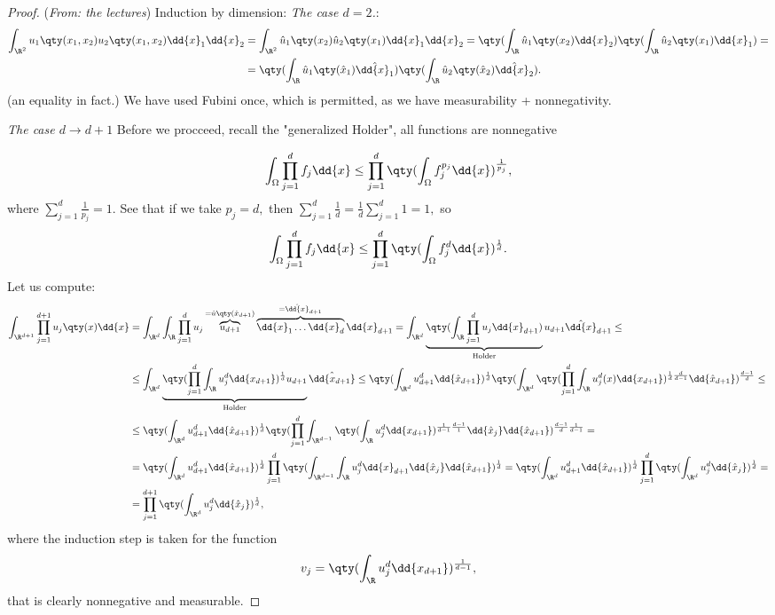 \begin{proof}(\textit{From: the lectures})
	Induction by dimension:
	\textit{The case $d = 2$.}:
	\begin{align*}
		\int_{\R^{2}}u_1\qty(x_1,x_2)u_2\qty(x_1,x_2)\dd{x}_1 \dd{x}_2 &= \int_{\R^{2}}\hat{u}_1\qty(x_2) \hat{u}_2\qty(x_1)\dd{x}_1 \dd{x}_2 = \qty(\int_{\R}\hat{u}_1\qty(x_2)\dd{x}_2) \qty(\int_{\R}\hat{u}_2\qty(x_1)\dd{x}_1) = \\
		&=\qty(\int_{\R}\hat{u}_1\qty(\hat{x}_1)\hat{\dd{x}_1})\qty(\int_{\R}\hat{u}_2\qty(\hat{x}_2)\hat{\dd{x}_2}).
	\end{align*}
	(an equality in fact.) We have used Fubini once, which is permitted, as we have measurability + nonnegativity.

	\textit{The case $d \to d+1$}
	Before we procceed, recall the "generalized Holder", all functions are nonnegative

	\[
		\int_{\Omega}\prod_{j=1}^d f_j\dd{x} \leq \prod_{j=1}^d \qty(\int_{\Omega}f_j^{p_j}\dd{x})^{\frac{1}{p_j}},
	\]
	where $\sum_{j=1}^d \frac{1}{p_j}  = 1.$ See that if we take $p_j = d,$ then $\sum_{j=1}^d \frac{1}{d} = \frac{1}{d} \sum_{j=1}^d 1 =1,$ so
	\[
		\int_{\Omega}\prod_{j=1}^d f_j \dd{x} \leq \prod_{j=1}^d\qty(\int_{\Omega}f_j^d\dd{x})^{\frac{1}{d}}.
	\]
	Let us compute:
	\begin{align*}
		\int_{\R^{d+1}}\prod_{j=1}^{d+1} u_j\qty(x)\dd{x}&=\int_{\R^d}\int_{\R}\prod_{j=1}^d u_j \overbrace{u_{d+1}}^{=\hat{u}\qty(\hat{x}_{d+1})}\overbrace{\dd{x}_1 \dots \dd{x}_d}^{=\hat{\dd{x}}_{d+1}}\dd{x}_{d+1} = \int_{\R^{d}}\underbrace{\qty(\int_{\R}\prod_{j=1}^d u_j\dd{x}_{d+1})}_{\text{Holder}}u_{d+1}\hat{\dd{x}}_{d+1} \leq \\
								 &\leq \int_{\R^d}\underbrace{\qty(\prod_{j=1}^d \int_{\R}u_j^d\dd{x_{d+1}})^{\frac{1}{d}}u_{d+1}}_{\text{Holder}}\hat{\dd{x_{d+1}}} \leq \qty(\int_{\R^{d}}u_{d+1}^d\dd{\hat{x}_{d+1}})^{\frac{1}{d}}\qty(\int_{\R^d}\qty(\prod_{j=1}^d \int_{\R}u_j^d(x)\dd{x_{d+1}})^{\frac{1}{d}\frac{d}{d-1}}\dd{\hat{x}_{d+1}})^{\frac{d-1}{d}} \leq \\
								 &\leq \qty(\int_{\R^d}u_{d+1}^d\dd{\hat{x}_{d+1}})^{\frac{1}{d}}\qty(\prod_{j=1}^d\int_{\R^{d-1}}\qty(\int_{\R}u_j^d\dd{x_{d+1}})^{\frac{1}{d-1}\frac{d-1}{1}}\dd{\hat{x}_j}\dd{\hat{x}_{d+1}})^{\frac{d-1}{d} \frac{1}{d-1}} = \\
								 &= \qty(\int_{\R^{d}}u_{d+1}^d \dd{\hat{x}_{d+1}})^{\frac{1}{d}}\prod_{j=1}^d\qty(\int_{\R^{d-1}}\int_{\R}u_j^d\dd{x}_{d+1}\dd{\hat{x}_{j}}\dd{\hat{x}_{d+1}})^{\frac{1}{d}} = \qty(\int_{\R^{d}}u_{d+1}^d\dd{\hat{x}_{d+1}})^\frac{1}{d} \prod_{j=1}^d \qty(\int_{\R^{d}}u_j^d\dd{\hat{x}_j})^{\frac{1}{d}} = \\
								 &= \prod_{j=1}^{d+1} \qty(\int_{\R^{d}}u_j^d\dd{\hat{x}_j})^{\frac{1}{d}},
	\end{align*}
	where the induction step is taken for the function
	\[
		v_j=\qty(\int_{\R}u_j^d\dd{x_{d+1}})^{\frac{1}{d-1}},
	\]
	that is clearly nonnegative and measurable.
\end{proof}

